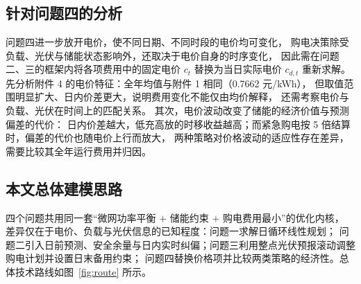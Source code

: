 \subsection{针对问题四的分析}
问题四进一步放开电价，使不同日期、不同时段的电价均可变化，
购电决策除受负载、光伏与储能状态影响外，还取决于电价自身的时序变化，
因此需在问题二、三的框架内将各项费用中的固定电价 $c_t$ 替换为当日实际电价 $c_{d,t}$ 重新求解。
先分析附件 4 的电价特征：全年均值与附件 1 相同（0.7662 元/kWh），
但取值范围明显扩大、日内价差更大，说明费用变化不能仅由均价解释，
还需考察电价与负载、光伏在时间上的匹配关系。
其次，电价波动改变了储能的经济价值与预测偏差的代价：
日内价差越大，低充高放的时移收益越高；而紧急购电按 5 倍结算时，偏差的代价也随电价上行而放大，
两种策略对价格波动的适应性存在差异，需要比较其全年运行费用并归因。

\subsection{本文总体建模思路}
四个问题共用同一套“微网功率平衡 $+$ 储能约束 $+$ 购电费用最小”的优化内核，
差异仅在于电价、负载与光伏信息的已知程度：问题一求解日循环线性规划；
问题二引入日前预测、安全余量与日内实时纠偏；问题三利用整点光伏预报滚动调整购电计划并设置日末备用约束；
问题四替换价格项并比较两类策略的经济性。总体技术路线如图~\ref{fig:route} 所示。

